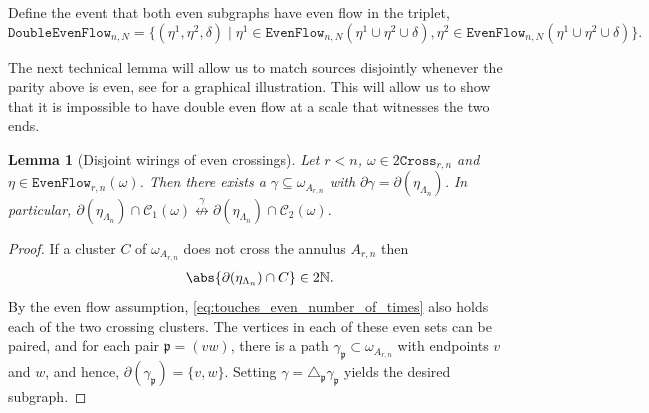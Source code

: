 \documentclass[article,11pt,reqno]{amsart}
\newcommand{\N}{\mathbb{N}}
\newcommand{\cc}{\leftrightarrow}
\newtheorem{lemma}[theorem]{Lemma}
\begin{document}
Define the event that both even subgraphs have even flow in the triplet,  
$$\mathtt{DoubleEvenFlow}_{n,N} = \{(\eta^1, \eta^2, \delta)  \mid  \eta^1 \in  \mathtt{EvenFlow}_{n,N}(\eta^1 \cup \eta^2\cup \delta),  \eta^2 \in  \mathtt{EvenFlow}_{n,N}(\eta^1 \cup \eta^2\cup \delta)\}.$$

The next technical lemma will allow us to match sources disjointly whenever the parity above is even, see  for a graphical illustration.  This will allow us to show that it is impossible to have double even flow at a scale that witnesses the two ends. 

\begin{lemma}[Disjoint wirings of even crossings]\label{lemma:disjoint_wiring}
Let $r < n$, $\omega \in 2\mathtt{Cross}_{r,n}$ and  $\eta \in \mathtt{EvenFlow}_{r,n}(\omega)$.
Then there exists a $\gamma \subseteq \omega_{A_{r,n}}$ with $\partial \gamma = \partial(\eta_{\Lambda_n})$.
In particular,
$
\partial(\eta_{\Lambda_n}) \cap \mathcal{C}_1(\omega) \overset{\gamma}{\not \cc} \partial(\eta_{\Lambda_n}) \cap \mathcal{C}_2(\omega).
$
\end{lemma}
\begin{proof}
If a cluster $C$ of $\omega_{A_{r,n}}$ does not cross the annulus $A_{r,n}$ then
\begin{align}\label{eq:touches_even_number_of_times}
    \abs{\partial(\eta_{\Lambda_n}) \cap C} \in 2\N.
\end{align}
By the even flow assumption,  \eqref{eq:touches_even_number_of_times} also holds each of the two crossing clusters.
The vertices in each of these even sets can be paired, and for each pair $\mathfrak{p} = (vw)$, there is a  path $\gamma_\mathfrak{p}\subset \omega_{A_{r,n}}$ with endpoints $v$ and $w$, and hence, $\partial(\gamma_{\mathfrak{p}})=\{v,w\}$. Setting $\gamma = \triangle_{\mathfrak{p}} \gamma_\mathfrak{p}$ yields the desired subgraph.
\end{proof}
\end{document}

